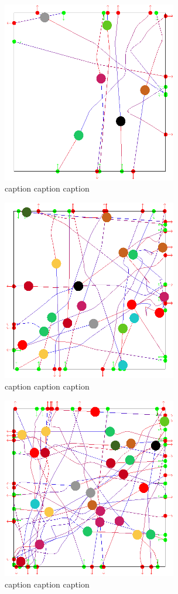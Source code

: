 \begin{figure}[H]
 \centering
 \includegraphics[width=3in]{images/res-10-entry-exit.png}
 \caption{caption caption caption}
\end{figure}

\begin{figure}[H]
 \centering
 \includegraphics[width=3in]{images/res-20-entry-exit.png}
 \caption{caption caption caption}
\end{figure}

\begin{figure}[H]
 \centering
 \includegraphics[width=3in]{images/res-30-entry-exit.png}
 \caption{caption caption caption}
\end{figure}

